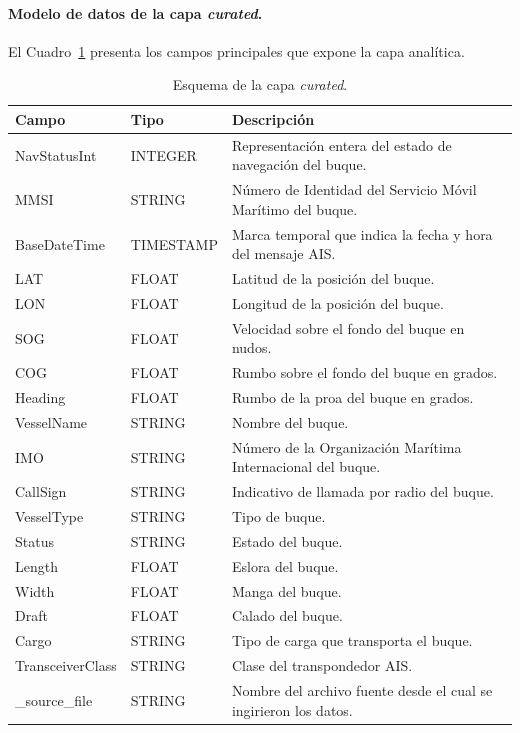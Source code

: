 \documentclass[10pt]{article}
\begin{document}
\paragraph{Modelo de datos de la capa \textit{curated}.}
El Cuadro~\ref{tab:curated_schema} presenta los campos principales que expone la capa analítica.

\begin{table}[H]
  \centering
  \caption{Esquema de la capa \textit{curated}.}
  \label{tab:curated_schema}
  \scriptsize
  \begin{tabular}{@{}llp{8cm}@{}}
  \toprule
  Campo & Tipo & Descripción \\
  \midrule
  NavStatusInt & INTEGER & Representación entera del estado de navegación del buque. \\
  MMSI & STRING & Número de Identidad del Servicio Móvil Marítimo del buque. \\
  BaseDateTime & TIMESTAMP & Marca temporal que indica la fecha y hora del mensaje AIS. \\
  LAT & FLOAT & Latitud de la posición del buque. \\
  LON & FLOAT & Longitud de la posición del buque. \\
  SOG & FLOAT & Velocidad sobre el fondo del buque en nudos. \\
  COG & FLOAT & Rumbo sobre el fondo del buque en grados. \\
  Heading & FLOAT & Rumbo de la proa del buque en grados. \\
  VesselName & STRING & Nombre del buque. \\
  IMO & STRING & Número de la Organización Marítima Internacional del buque. \\
  CallSign & STRING & Indicativo de llamada por radio del buque. \\
  VesselType & STRING & Tipo de buque. \\
  Status & STRING & Estado del buque. \\
  Length & FLOAT & Eslora del buque. \\
  Width & FLOAT & Manga del buque. \\
  Draft & FLOAT & Calado del buque. \\
  Cargo & STRING & Tipo de carga que transporta el buque. \\
  TransceiverClass & STRING & Clase del transpondedor AIS. \\
  \_source\_file & STRING & Nombre del archivo fuente desde el cual se ingirieron los datos. \\

\end{tabular}
\end{table}
\end{document}
